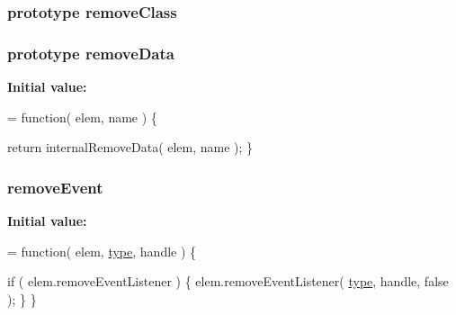\hypertarget{jquery-1_810_82-vsdoc_8js_a7cb7158f409485c170580c2afea3e234}{
\subsubsection[{remove\-Class}]{ {\bf prototype} remove\-Class}}\label{jquery-1_810_82-vsdoc_8js_a7cb7158f409485c170580c2afea3e234}
\hypertarget{jquery-1_810_82-vsdoc_8js_a4da6cd95c6aa2933e1fc145392d22460}{
\subsubsection[{remove\-Data}]{ {\bf prototype} remove\-Data}}\label{jquery-1_810_82-vsdoc_8js_a4da6cd95c6aa2933e1fc145392d22460}
{\bfseries Initial value\-:}
\begin{DoxyCode}
= \textcolor{keyword}{function}( elem, name ) \{


        \textcolor{keywordflow}{return} internalRemoveData( elem, name );
    \}
\end{DoxyCode}
\hypertarget{jquery-1_810_82-vsdoc_8js_aa1c5d81df6a0efc8b733d7df6f1faffd}{
\subsubsection[{remove\-Event}]{ remove\-Event}}\label{jquery-1_810_82-vsdoc_8js_aa1c5d81df6a0efc8b733d7df6f1faffd}
{\bfseries Initial value\-:}
\begin{DoxyCode}
= \textcolor{keyword}{function}( elem, \hyperlink{jquery-1_810_82-vsdoc_8js_a3940565e83a9bfd10d95ffd27536da91}{type}, handle ) \{

        \textcolor{keywordflow}{if} ( elem.removeEventListener ) \{
            elem.removeEventListener( \hyperlink{jquery-1_810_82-vsdoc_8js_a3940565e83a9bfd10d95ffd27536da91}{type}, handle, \textcolor{keyword}{false} );
        \}
    \}
\end{DoxyCode}
